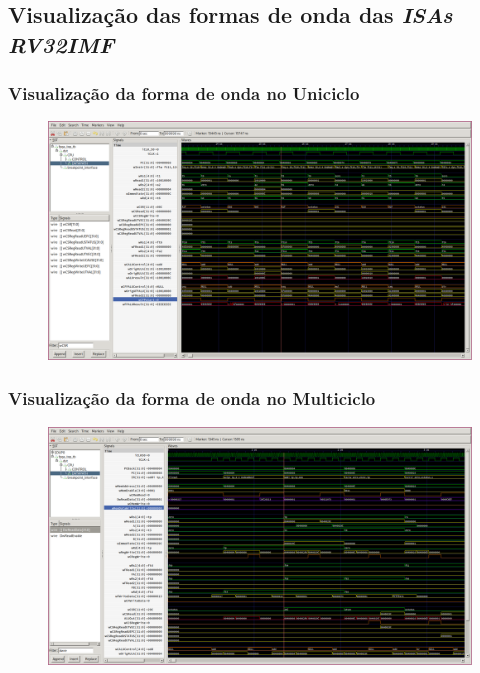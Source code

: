 \documentclass[aspectratio=169]{beamer}
\begin{document}
    \subsection{Visualização das formas de onda das \textit{ISAs RV32IMF}}
    \begin{frame}
        \frametitle{Visualização da forma de onda no Uniciclo}
        \vfill
        \begin{figure}[H]
        \centering
            \includegraphics[width=.95\textwidth,height=.85\textheight,keepaspectratio]
            {../images/gtkwave/gtkwave_uni.png}
        \end{figure}
        \vfill
    \end{frame}

    \begin{frame}
        \frametitle{Visualização da forma de onda no Multiciclo}
        \vfill
        \begin{figure}[H]
        \centering
            \includegraphics[width=.95\textwidth,height=.85\textheight,keepaspectratio]
            {../images/gtkwave/gtkwave_multi.png}
        \end{figure}
        \vfill
    \end{frame}
\end{document}
